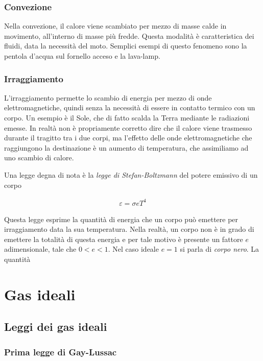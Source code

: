 \subsubsection{Convezione}
Nella convezione, il calore viene scambiato per mezzo di masse calde
in movimento, all'interno di masse più fredde. Questa modalità è
caratteristica dei fluidi, data la necessità del moto. Semplici esempi
di questo fenomeno sono la pentola d'acqua sul fornello acceso e la
lava-lamp.

\subsubsection{Irraggiamento}
L'irraggiamento permette lo scambio di energia per mezzo di onde
elettromagnetiche, quindi senza la necessità di essere in contatto
termico con un corpo. Un esempio è il Sole, che di fatto scalda la
Terra mediante le radiazioni emesse. In realtà non è propriamente
corretto dire che il calore viene trasmesso durante il tragitto tra
i due corpi, ma l'effetto delle onde elettromagnetiche che raggiungono
la destinazione è un aumento di temperatura, che assimiliamo ad uno
scambio di calore.

Una legge degna di nota è la \textit{legge di Stefan-Boltzmann} del
potere emissivo di un corpo

\begin{align}
    \varepsilon = \sigma e T^4
\end{align}

\noindent Questa legge esprime la quantità di energia che un corpo
può emettere per irraggiamento data la sua temperatura. Nella realtà,
un corpo non è in grado di emettere la totalità di questa energia
e per tale motivo è presente un fattore $e$ adimensionale, tale che
$0 < e < 1$. Nel caso ideale $e = 1$ si parla di \textit{corpo nero}.
La quantità

\section{Gas ideali}

\subsection{Leggi dei gas ideali}

\subsubsection*{Prima legge di Gay-Lussac}
